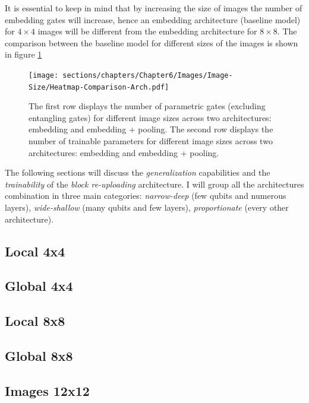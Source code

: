 It is essential to keep in mind that by increasing the size of images the number of embedding gates will
increase, hence an embedding architecture (baseline model) for $4\times4$ images will be different 
from the embedding architecture for $8\times8$.
The comparison between the baseline model for different sizes of the images is shown in figure 
\ref{arc:embed-pooling}

\begin{figure}[h]
    \centering
    \texttt{[image: sections/chapters/Chapter6/Images/Image-Size/Heatmap-Comparison-Arch.pdf]}
    \caption{The first row displays the number of parametric gates (excluding entangling gates) for 
    different image sizes across two architectures: embedding and embedding + pooling.
    The second row displays the number of trainable parameters for 
    different image sizes across two architectures: embedding and embedding + pooling.}
    \label{arc:embed-pooling}
\end{figure}


The following sections will discuss the \textit{generalization} capabilities and the 
\textit{trainability} of the \textit{block re-uploading} architecture.
I will group all the architectures combination in three main categories: \textit{narrow-deep} 
(few qubits and numerous layers), \textit{wide-shallow} (many qubits and few layers), \textit{proportionate}
(every other architecture). 


\subsection{Local 4x4}


\subsection{Global 4x4}


\subsection{Local 8x8}


\subsection{Global 8x8}



\subsection{Images 12x12}


